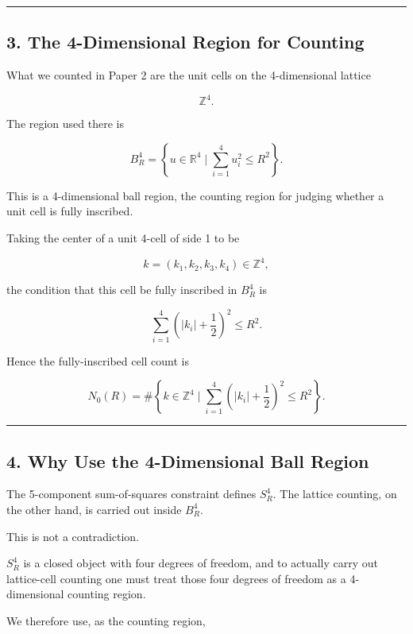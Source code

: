 \documentclass[
]{article}
\begin{document}
\begin{center}\rule{0.5\linewidth}{0.5pt}\end{center}

\subsection{3. The 4-Dimensional Region for
Counting}\label{the-4-dimensional-region-for-counting}

What we counted in Paper 2 are the unit cells on the 4-dimensional
lattice

\[
\mathbb{Z}^4 .
\]

The region used there is

\[
B^4_R
=
\left\{
u\in\mathbb{R}^4
\mid
\sum_{i=1}^{4}u_i^2\le R^2
\right\} .
\]

This is a 4-dimensional ball region, the counting region for judging
whether a unit cell is fully inscribed.

Taking the center of a unit 4-cell of side 1 to be

\[
k=(k_1,k_2,k_3,k_4)\in\mathbb{Z}^4 ,
\]

the condition that this cell be fully inscribed in \(B^4_R\) is

\[
\sum_{i=1}^{4}
\left(|k_i|+\frac12\right)^2
\le R^2 .
\]

Hence the fully-inscribed cell count is

\[
N_0(R)
=
\#\left\{
k\in\mathbb{Z}^4
\mid
\sum_{i=1}^{4}
\left(|k_i|+\frac12\right)^2
\le R^2
\right\} .
\]

\begin{center}\rule{0.5\linewidth}{0.5pt}\end{center}

\subsection{4. Why Use the 4-Dimensional Ball
Region}\label{why-use-the-4-dimensional-ball-region}

The 5-component sum-of-squares constraint defines \(S^4_R\). The lattice
counting, on the other hand, is carried out inside \(B^4_R\).

This is not a contradiction.

\(S^4_R\) is a closed object with four degrees of freedom, and to
actually carry out lattice-cell counting one must treat those four
degrees of freedom as a 4-dimensional counting region.

We therefore use, as the counting region,
\end{document}
